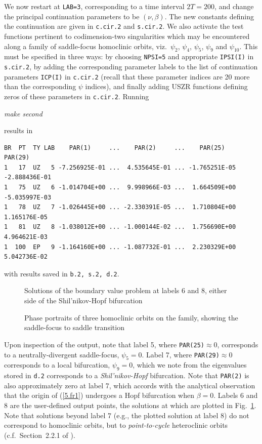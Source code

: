\documentclass[12pt]{report}
\begin{document}
We now restart at {\tt LAB=3}, corresponding to a time interval $2T=200$,
and change the principal continuation parameters to be $(\nu,\beta)$.
The new constants defining the continuation are given in {\tt c.cir.2}
and {\tt s.cir.2}.
We also activate the test functions pertinent to codimension-two
singularities which may be encountered along a family of saddle-focus
homoclinic orbits, viz.\ $\psi_2$, $\psi_4$, $\psi_5$, $\psi_9$ and $\psi_{10}$.
This must be specified in three ways: by choosing {\tt NPSI=5} and appropriate
{\tt IPSI(I)} in {\tt s.cir.2}, by adding the corresponding parameter labels
to the list of continuation parameters {\tt ICP(I)} in {\tt c.cir.2}
(recall that these parameter indices are 20 more than the corresponding
$\psi$ indices), and finally adding USZR functions defining zeros of
these parameters in {\tt c.cir.2}. Running 
\begin{center}  
{\it make second}
\end{center} 
results in
\begin{verbatim}
BR  PT  TY LAB    PAR(1)     ...    PAR(2)     ...    PAR(25)       PAR(29)    
1   17  UZ   5 -7.256925E-01 ...  4.535645E-01 ... -1.765251E-05 -2.888436E-01
1   75  UZ   6 -1.014704E+00 ...  9.998966E-03 ...  1.664509E+00 -5.035997E-03
1   78  UZ   7 -1.026445E+00 ... -2.330391E-05 ...  1.710804E+00  1.165176E-05
1   81  UZ   8 -1.038012E+00 ... -1.000144E-02 ...  1.756690E+00  4.964621E-03  
1  100  EP   9 -1.164160E+00 ... -1.087732E-01 ...  2.230329E+00  5.042736E-02
\end{verbatim}
with results saved in {\tt b.2, s.2, d.2}.
\begin{figure}[p]
\epsfysize 9.0cm
\centerline{}
\caption{Solutions of the boundary value problem at labels 6 and 8, 
either side of the Shil'nikov-Hopf bifurcation}
\label{Fcircuit1}
\end{figure}
\begin{figure}[p]
\epsfysize 9.0cm
\centerline{}
\caption{Phase portraits of three homoclinic orbits 
on the family, showing the saddle-focus to saddle transition}
\label{Fcircuit2}
\end{figure}
Upon inspection of the output, note that label 5, where {\tt PAR(25)}$\approx 0$, 
corresponds to a neutrally-divergent saddle-focus, $\psi_5=0$. 
Label 7, where {\tt PAR(29)}$\approx 0$ corresponds to a local bifurcation, $\psi_9=0$, 
which we note from the eigenvalues stored in {\tt d.2} corresponds to a {\it
Shil'nikov-Hopf} bifurcation. Note that {\tt PAR(2)} is also approximately zero
at label 7, which accords with the analytical observation that the origin of
(\ref{5.fr1}) undergoes a Hopf bifurcation when $\beta=0$.
Labels 6 and 8 are the user-defined output
points, the solutions at which are plotted in Fig.\ \ref{Fcircuit1}.
Note that solutions beyond label 7 (e.g., the plotted solution
at label 8) do not correspond to homoclinic orbits, but to 
{\it point-to-cycle} heteroclinic orbits (c.f.\ Section~2.2.1 of
).
\end{document}
